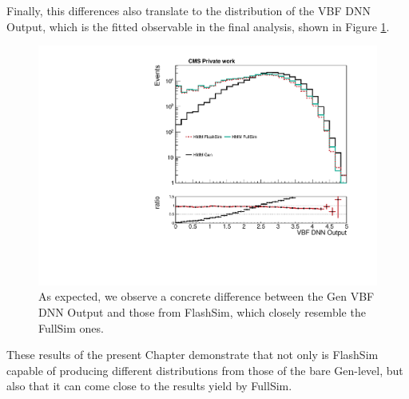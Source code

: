   Finally, this differences also translate to the distribution of the VBF DNN Output, which is the fitted observable in the final analysis, shown in Figure \ref{fig:dnngen}.
  
  \begin{figure}
    \centering
    \includegraphics[width=\linewidth]{gfx/ch6/gen_vs_flash_DNN18Atan_noqgl___PreSel_log.pdf}
    \caption[Gen vs FlashSim for VBF DNN]{As expected, we observe a concrete difference between the Gen VBF DNN Output and those from FlashSim, which closely resemble the FullSim ones.}
    \label{fig:dnngen}
   \end{figure}
   
  These results of the present Chapter demonstrate that not only is FlashSim capable of producing different distributions from those of the bare Gen-level, but also that it can come close to the results yield by FullSim.